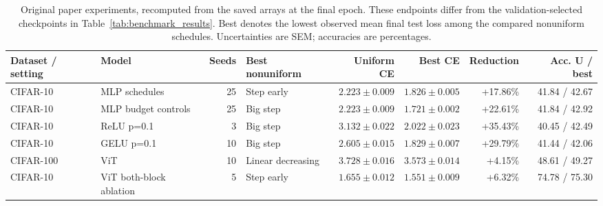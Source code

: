 \begin{table}[t]
\centering
\caption{Original paper experiments, recomputed from the saved arrays at the final epoch. These endpoints differ from the validation-selected checkpoints in Table~\ref{tab:benchmark_results}. Best denotes the lowest observed mean final test loss among the compared nonuniform schedules. Uncertainties are SEM; accuracies are percentages.}
\label{tab:loss_improvements}
\footnotesize
\setlength{\tabcolsep}{3pt}
\begin{tabular}{@{}llrlrrrr@{}}
\toprule
Dataset / setting & Model & Seeds & Best nonuniform & Uniform CE & Best CE & Reduction & Acc. U / best \\
\midrule
CIFAR-10 & MLP schedules & 25 & Step early & \(2.223\pm0.009\) & \(1.826\pm0.005\) & +17.86\% & 41.84 / 42.67 \\
CIFAR-10 & MLP budget controls & 25 & Big step & \(2.223\pm0.009\) & \(1.721\pm0.002\) & +22.61\% & 41.84 / 42.92 \\
CIFAR-10 & ReLU p=0.1 & 3 & Big step & \(3.132\pm0.022\) & \(2.022\pm0.023\) & +35.43\% & 40.45 / 42.49 \\
CIFAR-10 & GELU p=0.1 & 10 & Big step & \(2.605\pm0.015\) & \(1.829\pm0.007\) & +29.79\% & 41.44 / 42.06 \\
CIFAR-100 & ViT & 10 & Linear decreasing & \(3.728\pm0.016\) & \(3.573\pm0.014\) & +4.15\% & 48.61 / 49.27 \\
CIFAR-10 & ViT both-block ablation & 5 & Step early & \(1.655\pm0.012\) & \(1.551\pm0.009\) & +6.32\% & 74.78 / 75.30 \\
\bottomrule
\end{tabular}
\end{table}
